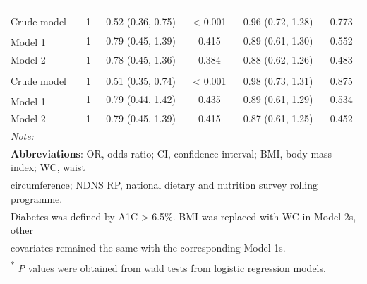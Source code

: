 \begin{table}[H]
\begin{tabular}[t]{lccccc}
		\addlinespace[0.3em]
		\multicolumn{6}{l}{\textbf{Women (n = 3618)}}\\
		\addlinespace[0.3em]
		\multicolumn{6}{l}{\hspace{1em}\textbf{Hypertension}}\\
		\hspace{1em}\hspace{1em}Crude model & 1 & 0.52 (0.36, 0.75) & < 0.001 & 0.96 (0.72, 1.28) & 0.773\\
		\hspace{1em}\hspace{1em}Model 1\textsuperscript{\ddag} & 1 & 0.79 (0.45, 1.39) & 0.415 & 0.89 (0.61, 1.30) & 0.552\\
		\hspace{1em}\hspace{1em}Model 2 & 1 & 0.78 (0.45, 1.36) & 0.384 & 0.88 (0.62, 1.26) & 0.483\\
		\addlinespace[0.3em]
		\multicolumn{6}{l}{\hspace{1em}\textbf{Hypertension in non-diabetics}}\\
		\hspace{1em}\hspace{1em}Crude model & 1 & 0.51 (0.35, 0.74) & < 0.001 & 0.98 (0.73, 1.31) & 0.875\\
		\hspace{1em}\hspace{1em}Model 1\textsuperscript{\ddag} & 1 & 0.79 (0.44, 1.42) & 0.435 & 0.89 (0.61, 1.29) & 0.534\\
		\hspace{1em}\hspace{1em}Model 2 & 1 & 0.79 (0.45, 1.39) & 0.415 & 0.87 (0.61, 1.25) & 0.452\\
		\bottomrule
		\multicolumn{6}{l}{{\scriptsize \textit{Note: }}}\\
		\multicolumn{6}{l}{{\scriptsize \textbf{Abbreviations}: OR, odds ratio; CI, confidence interval; BMI, body mass index; WC, waist}}\\
		\multicolumn{6}{l}{{\scriptsize  circumference; NDNS RP, national dietary and nutrition survey rolling programme.}}\\
		\multicolumn{6}{l}{{\scriptsize Diabetes was defined by A1C > 6.5\%. BMI was replaced with WC in Model 2s, other}}\\
		\multicolumn{6}{l}{{\scriptsize covariates remained the same with the corresponding Model 1s.}}\\
		\multicolumn{6}{l}{{\scriptsize \textsuperscript{*} \textit{P} values were obtained from wald tests from logistic regression models.}}\\ 

\end{tabular}
\end{table}
